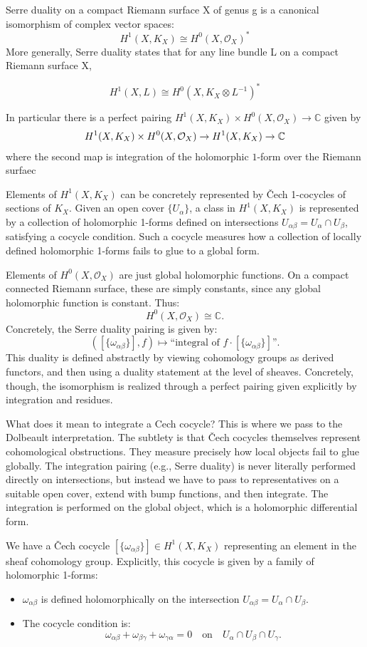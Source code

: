 \documentclass[12pt]{article}
\begin{document}
Serre duality on a compact Riemann surface X of genus g is a canonical isomorphism of complex vector spaces:
\[H^1(X, K_X) \cong H^0(X, \mathcal{O}_X)^{\ast}\]
More generally, Serre duality states that for any line bundle L on a compact Riemann surface X,

\[H^1(X, L) \cong H^0(X, K_X \otimes L^{-1})^{\ast}\]

In particular there is a perfect pairing $H^1(X,K_X)\times H^0(X,\mathcal{O}_X)\longrightarrow\mathbb{C}$ given by \begin{align*}
    H^1(X,K_X)\times H^0(X,\mathcal{O}_X) \to H^1(X, K_X) \to \mathbb{C}
\end{align*} where the second map is integration of the holomorphic $1$-form over the Riemann surfaec

Elements of $H^1(X, K_X)$ can be concretely represented by Čech 1-cocycles of sections of $K_X$. Given an open cover $\{U_\alpha\}$, a class in $H^1(X, K_X)$ is represented by a collection of holomorphic 1-forms defined on intersections $U_{\alpha\beta} = U_\alpha \cap U_\beta$, satisfying a cocycle condition. Such a cocycle measures how a collection of locally defined holomorphic 1-forms fails to glue to a global form.

Elements of $H^0(X, \mathcal{O}_X)$ are just global holomorphic functions. On a compact connected Riemann surface, these are simply constants, since any global holomorphic function is constant. Thus:
\[
H^0(X, \mathcal{O}_X) \cong \mathbb{C}.
\]
Concretely, the Serre duality pairing is given by: 
\[
([\{\omega_{\alpha\beta}\}], f) \mapsto \text{“integral of } f \cdot [\{\omega_{\alpha\beta}\}] \text{”}.
\]
This duality is defined abstractly by viewing cohomology groups as derived functors, and then using a duality statement at the level of sheaves. Concretely, though, the isomorphism is realized through a perfect pairing given explicitly by integration and residues.

What does it mean to integrate a Cech cocycle? This is where we pass to the Dolbeault interpretation. The subtlety is that Čech cocycles themselves represent cohomological obstructions. They measure precisely how local objects fail to glue globally. The integration pairing (e.g., Serre duality) is never literally performed directly on intersections, but instead we have to pass to representatives on a suitable open cover, extend with bump functions, and then integrate. The integration is performed on the global object, which is a holomorphic differential form.

We have a Čech cocycle $[\{\omega_{\alpha\beta}\}] \in H^1(X,K_X)$ representing an element in the sheaf cohomology group.
Explicitly, this cocycle is given by a family of holomorphic 1-forms:
\begin{itemize}
    \item $\omega_{\alpha\beta}$ is defined holomorphically on the intersection $U_{\alpha\beta}=U_{\alpha}\cap U_{\beta}$.
    \item The cocycle condition is:
    \[
    \omega_{\alpha\beta} + \omega_{\beta\gamma} + \omega_{\gamma\alpha}=0\quad\text{on}\quad U_{\alpha}\cap U_{\beta}\cap U_{\gamma}.
    \]
\end{itemize}
\end{document}
